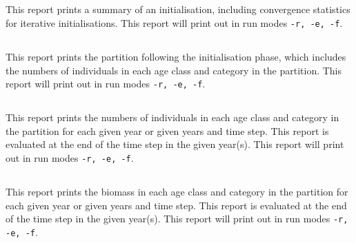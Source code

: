 \subsection{}\label{sec:Report-Initialisation}

This report prints a summary of an initialisation, including convergence statistics for iterative initialisations.  This report will print out in run modes \texttt{-r, -e, -f}.

\subsection{}\label{sec:Report-InitialisationPartition}

This report prints the partition following the initialisation phase, which includes the numbers of individuals in each age class and category in the partition. This report will print out in run modes \texttt{-r, -e, -f}.

\subsection{}\label{sec:Report-Partition}

This report prints the numbers of individuals in each age class and category in the partition for each given year or given years and time step. This report is evaluated at the end of the time step in the given year(s). This report will print out in run modes \texttt{-r, -e, -f}.

\subsection{}\label{sec:Report-PartitionBiomass}

This report prints the biomass in each age class and category in the partition for each given year or given years and time step. This report is evaluated at the end of the time step in the given year(s). This report will print out in run modes \texttt{-r, -e, -f}.
\ifAgeBased

\subsection{}\label{sec:Report-AgeLength}\label{sec:Report-LenthWeight}

